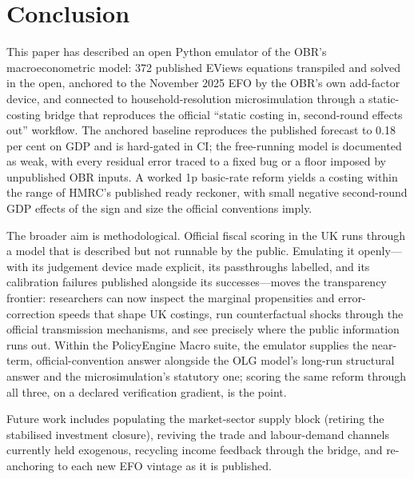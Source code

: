 \section{Conclusion}
\label{sec:conclusion}

This paper has described an open Python emulator of the OBR's macroeconometric model: 372 published EViews equations transpiled and solved in the open, anchored to the November 2025 EFO by the OBR's own add-factor device, and connected to household-resolution microsimulation through a static-costing bridge that reproduces the official ``static costing in, second-round effects out'' workflow. The anchored baseline reproduces the published forecast to 0.18 per cent on GDP and is hard-gated in CI; the free-running model is documented as weak, with every residual error traced to a fixed bug or a floor imposed by unpublished OBR inputs. A worked 1p basic-rate reform yields a costing within the range of HMRC's published ready reckoner, with small negative second-round GDP effects of the sign and size the official conventions imply.

The broader aim is methodological. Official fiscal scoring in the UK runs through a model that is described but not runnable by the public. Emulating it openly---with its judgement device made explicit, its passthroughs labelled, and its calibration failures published alongside its successes---moves the transparency frontier: researchers can now inspect the marginal propensities and error-correction speeds that shape UK costings, run counterfactual shocks through the official transmission mechanisms, and see precisely where the public information runs out. Within the PolicyEngine Macro suite, the emulator supplies the near-term, official-convention answer alongside the OLG model's long-run structural answer and the microsimulation's statutory one; scoring the same reform through all three, on a declared verification gradient, is the point.

Future work includes populating the market-sector supply block (retiring the stabilised investment closure), reviving the trade and labour-demand channels currently held exogenous, recycling income feedback through the bridge, and re-anchoring to each new EFO vintage as it is published.
